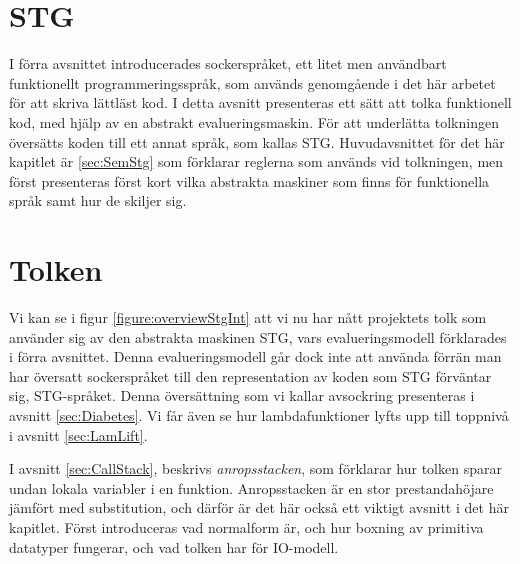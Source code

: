 \documentclass[Rapport]{subfiles}
\begin{document}
\chapter{STG}
\label{sec:Core}
\label{sec:STG}


\overviewStg

I förra avsnittet introducerades sockerspråket, ett litet men användbart
funktionellt programmeringsspråk, som används genomgående i det här
arbetet för att skriva lättläst kod.
    I detta avsnitt presenteras ett sätt att tolka funktionell kod, med hjälp av  
en abstrakt evalueringsmaskin. För att underlätta
tolkningen översätts koden till ett annat språk, som kallas STG. 
Huvudavsnittet för det här kapitlet är \ref{sec:SemStg} %
som förklarar reglerna som används vid tolkningen, men först presenteras först kort
vilka abstrakta maskiner som finns för funktionella språk samt hur de skiljer sig.






\chapter{Tolken}
\label{sec:Tolken}

\overviewStgInt

Vi kan se i figur \ref{figure:overviewStgInt} att vi nu har nått projektets tolk som använder sig av den abstrakta maskinen STG, vars
evalueringsmodell förklarades i förra avsnittet. Denna evalueringsmodell går
dock inte att använda förrän man har översatt
sockerspråket till den representation av koden som STG förväntar sig, STG-språket.
Denna översättning som vi kallar avsockring presenteras i avsnitt \ref{sec:Diabetes}.
Vi får även se hur lambdafunktioner lyfts upp till toppnivå i avsnitt \ref{sec:LamLift}.

I avsnitt \ref{sec:CallStack}, beskrivs \emph{anropsstacken}, som förklarar hur tolken
sparar undan lokala variabler i en funktion. Anropsstacken är en 
stor prestandahöjare jämfört med substitution, och därför är det här också ett
viktigt avsnitt i det här kapitlet. Först introduceras vad normalform är,
och hur boxning av 
primitiva datatyper fungerar, och vad tolken har
för IO-modell.






\end{document}
